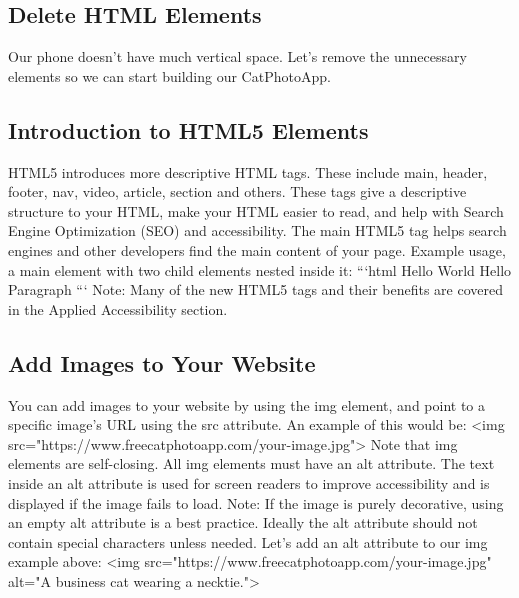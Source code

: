 \documentclass{article}%
\begin{document}
%
\subsection{Delete HTML Elements}%
\label{subsec:DeleteHTMLElements}%
Our phone doesn't have much vertical space.\newline%
Let's remove the unnecessary elements so we can start building our CatPhotoApp.\newline%

%
\subsection{Introduction to HTML5 Elements}%
\label{subsec:IntroductiontoHTML5Elements}%
HTML5 introduces more descriptive HTML tags. These include main, header, footer, nav, video, article, section and others.\newline%
These tags give a descriptive structure to your HTML, make your HTML easier to read, and help with Search Engine Optimization (SEO) and accessibility. The main HTML5 tag helps search engines and other developers find the main content of your page.\newline%
Example usage, a main element with two child elements nested inside it:\newline%
```html\newline%
Hello World\newline%
Hello Paragraph\newline%
```\newline%
Note: Many of the new HTML5 tags and their benefits are covered in the Applied Accessibility section.\newline%

%
\subsection{Add Images to Your Website}%
\label{subsec:AddImagestoYourWebsite}%
You can add images to your website by using the img element, and point to a specific image's URL using the src attribute.\newline%
An example of this would be:\newline%
<img src="https://www.freecatphotoapp.com/your{-}image.jpg">\newline%
Note that img elements are self{-}closing.\newline%
All img elements must have an alt attribute. The text inside an alt attribute is used for screen readers to improve accessibility and is displayed if the image fails to load.\newline%
Note: If the image is purely decorative, using an empty alt attribute is a best practice.\newline%
Ideally the alt attribute should not contain special characters unless needed.\newline%
Let's add an alt attribute to our img example above:\newline%
<img src="https://www.freecatphotoapp.com/your{-}image.jpg" alt="A business cat wearing a necktie.">\newline%
\end{document}
